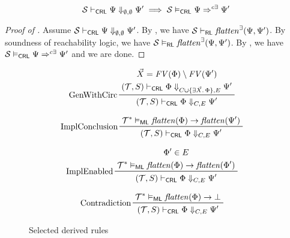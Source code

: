 \begin{theorem}\label{thm:proofsystemSoundness}
\begin{equation*}
    \mathcal{S} \vdash_{\mathsf{CRL}} \Psi \Downarrow_{\emptyset,\emptyset} \Psi^\prime \implies
    \mathcal{S} \vDash_{\mathsf{CRL}} \Psi \Rightarrow^{c\exists} \Psi^\prime
\end{equation*}
\end{theorem}
\begin{proof}[Proof of ]
Assume $\mathcal{S} \vdash_{\mathsf{CRL}} \Psi \Downarrow_{\emptyset,\emptyset} \Psi^\prime$.
By , we have $\mathcal{S} \vdash_{\mathsf{RL}} \mathit{flatten}^\exists(\Psi, \Psi^\prime)$.
By soundness of reachability logic, we have $\mathcal{S} \vDash_{\mathsf{RL}} \mathit{flatten}^\exists(\Psi, \Psi^\prime)$.
By , 
we have $\mathcal{S} \vDash_{\mathsf{CRL}} \Psi \Rightarrow^{c\exists} \Psi^\prime$ and we are done.
\end{proof}

\begin{figure}
  \begin{align*}
    & \prftree[l]{GenWithCirc}
      { \prfStackPremises
        { \vec{X} = \mathit{FV}(\Phi) \setminus \mathit{FV}(\Psi^\prime)
        }
        {(\mathcal{T}, S) \vdash_\CRL \Phi \Downarrow_{C \cup \{ \exists \vec{X}.\, \Phi  \}, E} \Psi^\prime}
      }
      {(\mathcal{T}, S) \vdash_\CRL \Phi \Downarrow_{C, E} \Psi^\prime}
  \end{align*}

  \begin{align*}
    & \prftree[l]{ImplConclusion}
      {\mathcal{T}^* \vDash_\ML \mathit{flatten}(\Phi) \rightarrow \mathit{flatten}(\Psi^\prime)}
      {(\mathcal{T}, S) \vdash_\CRL \Phi \Downarrow_{C, E} \Psi^\prime}
  \end{align*}

  \begin{align*}
    & \prftree[l]{ImplEnabled}
      { \prfStackPremises
        { \Phi^\prime \in E }
        {\mathcal{T}^* \vDash_\ML \mathit{flatten}(\Phi) \rightarrow \mathit{flatten}(\Phi^\prime)}
      }
      {(\mathcal{T}, S) \vdash_\CRL \Phi \Downarrow_{C, E} \Psi^\prime}
  \end{align*}

  \begin{align*}
    & \prftree[l]{Contradiction}
      {\mathcal{T}^* \vDash_\ML \mathit{flatten}(\Phi) \rightarrow \bot }
      {(\mathcal{T}, S) \vdash_\CRL \Phi \Downarrow_{C, E} \Psi^\prime}
  \end{align*}

  \caption{Selected derived rules}
  \label{fig:CRLderivedRules}
\end{figure}